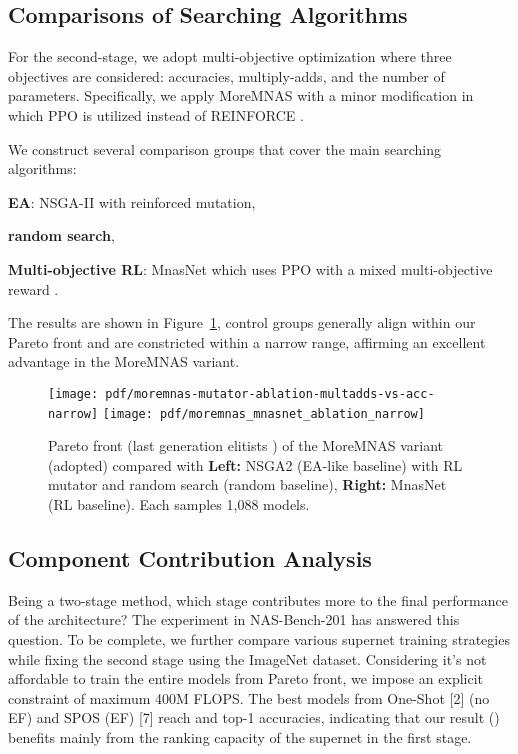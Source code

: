 \documentclass[10pt,twocolumn,letterpaper]{article}
\theoremstyle{definition}
\begin{document}
\subsection{Comparisons of Searching Algorithms}

For the second-stage, we adopt multi-objective optimization where three objectives are considered: accuracies, multiply-adds, and the number of parameters. Specifically, we apply MoreMNAS with a minor modification in which PPO \cite{schulman2017proximal} is utilized instead of REINFORCE \cite{sutton2018reinforcement}. 

We construct several comparison groups that cover the main searching algorithms: 
\begin{enumerate*}
\item \textbf{EA}: NSGA-II with reinforced mutation, 
\item \textbf{random search},
\item \textbf{Multi-objective RL}: MnasNet which uses PPO with a mixed multi-objective reward \cite{tan2018mnasnet}. 
\end{enumerate*}
The results are shown in Figure~\ref{fig:ablation_model}, control groups generally align within our Pareto front and are constricted within a narrow range, affirming an excellent advantage in the MoreMNAS variant. 

\begin{figure}[ht]
\centering
\texttt{[image: pdf/moremnas-mutator-ablation-multadds-vs-acc-narrow]}
\texttt{[image: pdf/moremnas\_mnasnet\_ablation\_narrow]}
\caption{Pareto front (last generation elitists ) of the MoreMNAS variant (adopted) compared with \textbf{Left:} NSGA2 (EA-like baseline) with RL mutator and random search (random baseline), 
\textbf{Right:} MnasNet (RL baseline). Each samples 1,088 models.} \label{fig:ablation_model}
\vskip -0.1in
\end{figure}


\subsection{Component Contribution Analysis} 

Being a two-stage method, which stage contributes more to the final performance of the architecture?
The experiment in NAS-Bench-201 has answered this question. To be complete,  we further compare various supernet training strategies while fixing the second stage using the ImageNet dataset.  Considering it's not affordable to train the entire models from Pareto front, we impose an explicit constraint of maximum 400M FLOPS. 
The best models from One-Shot [2] (no EF) and SPOS (EF) [7] reach   and  top-1 accuracies, indicating
 that our result () benefits mainly from the ranking capacity of the supernet in the first stage.
 
\end{document}
